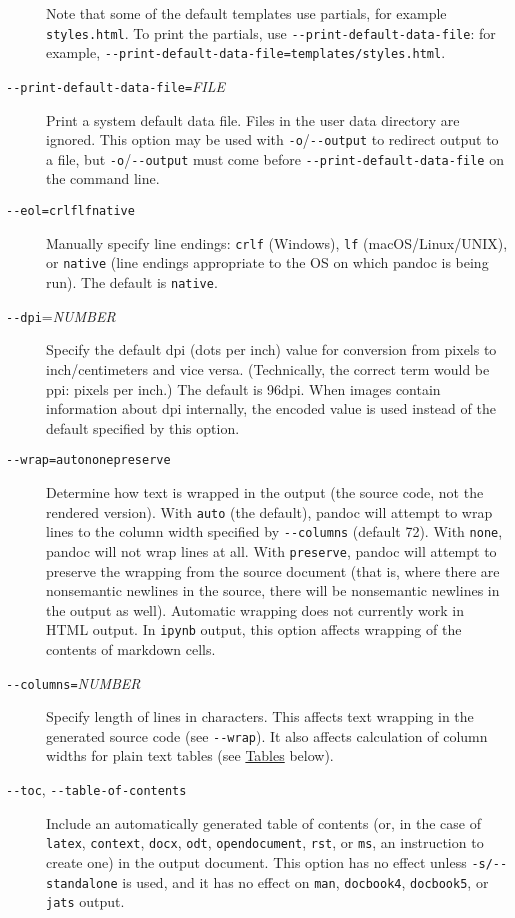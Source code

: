 \documentclass[]{article}
\begin{document}
\begin{description}
Note that some of the default templates use partials, for example
\texttt{styles.html}. To print the partials, use
\texttt{-\/-print-default-data-file}: for example,
\texttt{-\/-print-default-data-file=templates/styles.html}.
\item[\texttt{-\/-print-default-data-file=}\emph{FILE}]
Print a system default data file. Files in the user data directory are
ignored. This option may be used with \texttt{-o}/\texttt{-\/-output} to
redirect output to a file, but \texttt{-o}/\texttt{-\/-output} must come
before \texttt{-\/-print-default-data-file} on the command line.
\item[\texttt{-\/-eol=crlf}\textbar{}\texttt{lf}\textbar{}\texttt{native}]
Manually specify line endings: \texttt{crlf} (Windows), \texttt{lf}
(macOS/Linux/UNIX), or \texttt{native} (line endings appropriate to the
OS on which pandoc is being run). The default is \texttt{native}.
\item[\texttt{-\/-dpi}=\emph{NUMBER}]
Specify the default dpi (dots per inch) value for conversion from pixels
to inch/centimeters and vice versa. (Technically, the correct term would
be ppi: pixels per inch.) The default is 96dpi. When images contain
information about dpi internally, the encoded value is used instead of
the default specified by this option.
\item[\texttt{-\/-wrap=auto}\textbar{}\texttt{none}\textbar{}\texttt{preserve}]
Determine how text is wrapped in the output (the source code, not the
rendered version). With \texttt{auto} (the default), pandoc will attempt
to wrap lines to the column width specified by \texttt{-\/-columns}
(default 72). With \texttt{none}, pandoc will not wrap lines at all.
With \texttt{preserve}, pandoc will attempt to preserve the wrapping
from the source document (that is, where there are nonsemantic newlines
in the source, there will be nonsemantic newlines in the output as
well). Automatic wrapping does not currently work in HTML output. In
\texttt{ipynb} output, this option affects wrapping of the contents of
markdown cells.
\item[\texttt{-\/-columns=}\emph{NUMBER}]
Specify length of lines in characters. This affects text wrapping in the
generated source code (see \texttt{-\/-wrap}). It also affects
calculation of column widths for plain text tables (see
\protect\hyperlink{tables}{Tables} below).
\item[\texttt{-\/-toc}, \texttt{-\/-table-of-contents}]
Include an automatically generated table of contents (or, in the case of
\texttt{latex}, \texttt{context}, \texttt{docx}, \texttt{odt},
\texttt{opendocument}, \texttt{rst}, or \texttt{ms}, an instruction to
create one) in the output document. This option has no effect unless
\texttt{-s/-\/-standalone} is used, and it has no effect on
\texttt{man}, \texttt{docbook4}, \texttt{docbook5}, or \texttt{jats}
output.


\end{description}
\end{document}
